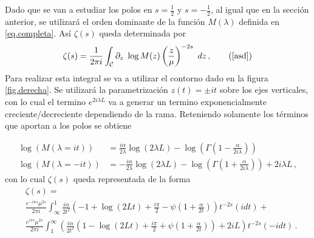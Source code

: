 Dado que se van a estudiar los polos en $s= \frac{1}{2}$ y $s=- \frac{1}{2}$, al igual que en la sección anterior, se utilizará el orden dominante de la función $M ( \lambda )$ definida en \eqref{eq.completa}. Así
$ \zeta (s)$ queda determinada por
\begin{equation}
\zeta (s) = 
\frac{1}{2 \pi i} 
\int _{\mathcal{C}}
\partial _z \ \log 	M(z)  \left( \frac{z}{\mu} \right) ^{-2s} \ dz
	\, ,
	\tag{\ref{asd}}
\end{equation}
Para realizar esta integral se va a utilizar el contorno dado en la figura \ref{fig.derecha}. Se utilizará la parametrización $ z (t) = \pm i t$ sobre los ejes verticales, con lo cual el termino $e ^{2 i \lambda L}$ va a generar un termino exponencialmente creciente/decreciente dependiendo de la rama. Reteniendo solamente los términos que aportan a los polos se obtiene
\begin{comment}
\begin{equation}
\begin{array}{c}
    \zeta  (s) = \\
     \frac{1}{2 \pi i} \int _{\infty} ^{1}
     \frac{ i \alpha }{2 t^2} 
     \left(
      1 + \frac{i \pi}{2} + Ln[2 t] + \psi (1 + \frac{\beta}{2 t})
     \right)
     t ^{-2s}
     e ^{- i \pi s} (i dt) + \\
     \frac{1}{2 \pi i} \int _{\infty} ^{1} 
     \left(
     2 + \frac{\beta}{2 t^2}
     \left(
     1 + \frac{i \pi}{2} - Ln[2 t] - \psi (1+ \frac{\beta}{2 t})
     \right)
     t ^{-2s}
     e ^{ i \pi s} (-i dt)
     \right)     
\end{array}
\end{equation}
\end{comment}
\begin{align}\label{eq.logatirmos}
\log ( M ( \lambda = i t ) ) &=   
\frac{i \alpha }{2 \lambda}  \log (2 \lambda L) - 
 \log \left( \Gamma \left( 1 - \frac{ \alpha}{2 i \lambda} \right) \right) \\ 
\log ( M ( \lambda=-i t ) ) &=   -  
\frac{i \alpha }{2 \lambda}  \log ( 2 \lambda L ) - 
 \log \left( \Gamma \left( 1 + \frac{ \alpha}{2 i \lambda} \right) \right) +
2 i \lambda L  \nonumber
	\,	,
\end{align}
con lo cual $\zeta (s)$ queda representada de la forma
\begin{align}\label{eq.zeta.logs}
     & \zeta  (s) = \\
     & \frac{e^{-i \pi s} \mu ^{2s}}{2 \pi i} \int _{\infty} ^{1}
     \frac{ i \alpha}{2 t^2}
     \left(
     - 1 +  \log (2 L t) + \frac{i \pi}{2}  - \psi \left( 1+\frac{\alpha}{2 t} \right)
     \right)
     t^{-2 s}
      \nonumber
     (i dt) + \\
     & \frac{e^{i \pi s} \mu ^{2s}}{2 \pi i} \int _1 ^{\infty}
	\left(      
     \frac{ i \alpha}{2  t^2}
     \left(
     1 -  \log (2 L t) + \frac{i \pi}{2} + \psi \left( 1 + \frac{\alpha}{2 t} \right)       
     \right)
     + 2 i L
     \right)
     t^{-2 s}
     (-i dt) \nonumber
     	\, .
\end{align}
